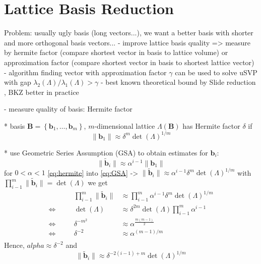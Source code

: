 
\section{Lattice Basis Reduction} %

Problem: usually ugly basis (long vectors...), we want a better basis with shorter and more orthogonal basis vectors...
- improve lattice basis quality => measure by hermite factor (compare shortest vector in basis to lattice volume) or approximation factor (compare shortest vector in basis to shortest lattice vector)
- algorithm finding vector with approximation factor $\gamma$ can be used to solve uSVP with gap $\lambda_2(\Lambda)/\lambda_1(\Lambda) > \gamma $
- best known theoretical bound by Slide reduction \cite{GN08a}, BKZ better in practice

- measure quality of basis: Hermite factor  %

  * basis $\mathbf{B} = \left\{\mathbf{b}_1, \ldots, \mathbf{b}_m\right\}$, $m$-dimensional lattice $\Lambda(\mathbf{B})$ has Hermite factor $\delta$ if
  \begin{equation} \label{eq:hermite}
    \| \mathbf{b}_1 \| \approx \delta^m \det(\Lambda)^{1/m}
  \end{equation}

  * use Geometric Series Assumption (GSA) to obtain estimates for $\mathbf{b}_i$: %
    \begin{equation} \label{eq:GSA}
      \| \tilde{\mathbf{b}}_i \| \approx \alpha^{i-1} \| \mathbf{b}_1 \|
    \end{equation}
    for $0 < \alpha < 1$
    \cref{eq:hermite} into \cref{eq:GSA} -> $\| \tilde{\mathbf{b}}_i \| \approx \alpha^{i-1} \delta^m \det(\Lambda)^{1/m}$
    with $\prod_{i-1}^m \| \tilde{\mathbf{b}}_i \| = \det(\Lambda)$ we get 
    \begin{align*}
      &\quad& \prod_{i-1}^m \| \tilde{\mathbf{b}}_i \| &\approx \prod_{i-1}^m \alpha^{i-1} \delta^m \det(\Lambda)^{1/m} \\
      \Leftrightarrow&\quad& \det(\Lambda) &\approx \delta^{2m} \det(\Lambda) \prod_{i-1}^m \alpha^{i-1}\\
      \Leftrightarrow&\quad& \delta^{-m^2}  &\approx \alpha^{\frac{m(m-1)}{2}}\\
      \Leftrightarrow&\quad& \delta^{-2}  &\approx \alpha^{(m-1)/m}\\
    \end{align*}
    Hence, $alpha \approx \delta^{-2}$ and 
    \begin{equation}
      \| \tilde{\mathbf{b}}_i \| \approx \delta^{-2(i-1) + m} \det(\Lambda)^{1/m}
    \end{equation}

